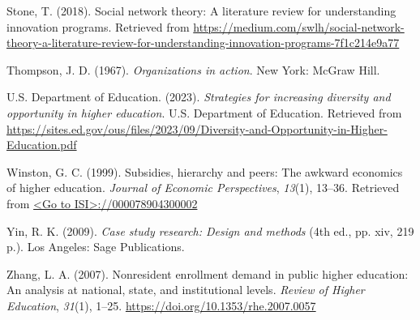 \documentclass[
  12pt,
]{article}
\newlength{\cslhangindent}
\newenvironment{CSLReferences}[2] %
 {\begin{list}{}{%
  \setlength{\itemindent}{0pt}
  \setlength{\leftmargin}{0pt}
  \setlength{\parsep}{0pt}
  \ifodd #1
   \setlength{\leftmargin}{\cslhangindent}
   \setlength{\itemindent}{-1\cslhangindent}
  \fi
  \setlength{\itemsep}{#2\baselineskip}}}
 {\end{list}}
\begin{document}
\begin{CSLReferences}{1}{0}
Stone, T. (2018). Social network theory: A literature review for understanding innovation programs. Retrieved from \url{https://medium.com/swlh/social-network-theory-a-literature-review-for-understanding-innovation-programs-7f1c214e9a77}

Thompson, J. D. (1967). \emph{Organizations in action}. New York: McGraw Hill.

U.S. Department of Education. (2023). \emph{Strategies for increasing diversity and opportunity in higher education}. U.S. Department of Education. Retrieved from \url{https://sites.ed.gov/ous/files/2023/09/Diversity-and-Opportunity-in-Higher-Education.pdf}

Winston, G. C. (1999). Subsidies, hierarchy and peers: The awkward economics of higher education. \emph{Journal of Economic Perspectives}, \emph{13}(1), 13--36. Retrieved from \href{\%3CGo\%20to\%20ISI\%3E://000078904300002}{\textless Go to ISI\textgreater://000078904300002}

Yin, R. K. (2009). \emph{Case study research: Design and methods} (4th ed., pp. xiv, 219 p.). Los Angeles: Sage Publications.

Zhang, L. A. (2007). Nonresident enrollment demand in public higher education: An analysis at national, state, and institutional levels. \emph{Review of Higher Education}, \emph{31}(1), 1--25. \url{https://doi.org/10.1353/rhe.2007.0057}

\end{CSLReferences}
\end{document}
